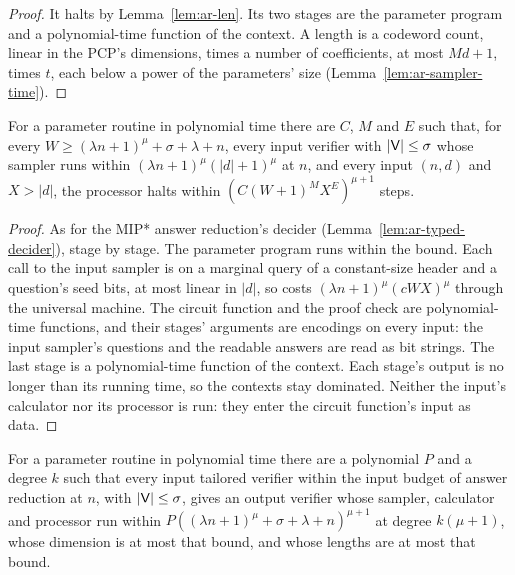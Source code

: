 \begin{proof}
\leanok
It halts by Lemma~\ref{lem:ar-len}. Its two stages are the parameter program and a
polynomial-time function of the context. A length is a codeword count, linear in the PCP's
dimensions, times a number of coefficients, at most $M d + 1$, times $t$, each below a power of
the parameters' size (Lemma~\ref{lem:ar-sampler-time}).
\end{proof}

\begin{lemma}
\label{lem:ar-lp-time}
\leanok
For a parameter routine in polynomial time there are $C$, $M$ and $E$ such that, for every
$W \geq (\lambda n + 1)^\mu + \sigma + \lambda + n$, every input verifier with
$|\mathsf{V}| \leq \sigma$ whose sampler runs within $(\lambda n + 1)^\mu (|d| + 1)^\mu$ at $n$,
and every input $(n, d)$ and $X > |d|$, the processor halts within
$(C (W + 1)^M X^E)^{\mu + 1}$ steps.
\end{lemma}

\begin{proof}
\leanok
As for the MIP* answer reduction's decider (Lemma~\ref{lem:ar-typed-decider}), stage by stage.
The parameter program runs within the bound. Each call to the input sampler is on a marginal
query of a constant-size header and a question's seed bits, at most linear in $|d|$, so costs
$(\lambda n + 1)^\mu (c W X)^\mu$ through the universal machine. The circuit function and the
proof check are polynomial-time functions, and their stages' arguments are encodings on every
input: the input sampler's questions and the readable answers are read as bit strings. The last
stage is a polynomial-time function of the context. Each stage's output is no longer than its
running time, so the contexts stay dominated. Neither the input's calculator nor its processor
is run: they enter the circuit function's input as data.
\end{proof}

\begin{theorem}
\label{thm:ar-output-within}
\leanok
For a parameter routine in polynomial time there are a polynomial $P$ and a degree $k$ such that
every input tailored verifier within the input budget of answer reduction at $n$, with
$|\mathsf{V}| \leq \sigma$, gives an output verifier whose sampler, calculator and processor run
within $P((\lambda n + 1)^\mu + \sigma + \lambda + n)^{\mu + 1}$ at degree $k (\mu + 1)$, whose
dimension is at most that bound, and whose lengths are at most that bound.
\end{theorem}

